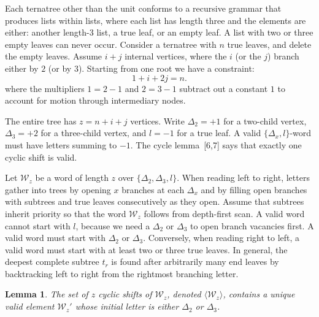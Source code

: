 \documentclass[11pt,fleqn]{article}
\theoremstyle{plain}
\newtheorem*{lemma}{Lemma}
\begin{document}
	Each ternatree other than the unit conforms to a recursive grammar that 
	produces lists within lists, where each list has length three and the 
	elements are either: another length-3 list, a true leaf, or an empty 
	leaf. A list with two or three empty leaves can never occur. 
	Consider a ternatree with $n$ true leaves, and delete the empty leaves. 
	Assume $i+j$ internal vertices, where the $i$ (or the $j$) branch 
	either by $2$ (or by $3$). Starting from one root we have a constraint: 
	\[
	1+i+2j=n.
	\]
	where the multipliers $1=2-1$ and $2=3-1$ subtract out a constant $1$ 
	to account for motion through intermediary nodes. 
	
	The entire tree has $z=n+i+j$ vertices.  Write $\Delta_2=+1$ 
	for a two-child vertex, $\Delta_3=+2$ for a three-child vertex, 
	and $l=-1$ for a true leaf. A valid $\{\Delta_x,l\}$-word must
	have letters summing to $-1$. The cycle lemma~[6,7] says that exactly one cyclic shift is valid. 
	
	Let $\mathcal{W}_z$ be a word of length $z$ over $\{\Delta_2,\Delta_3,l\}$. 
	When reading left to right, letters gather into trees by opening $x$ branches 
	at each $\Delta_x$ and by filling open branches with subtrees and true leaves 
	consecutively as they open. Assume that subtrees inherit priority so that the 
	word $\mathcal{W}_z$ follows from depth-first scan. A valid word cannot start 
	with $l$, because we need a $\Delta_2$ or $\Delta_3$ to open branch vacancies 
	first. A valid word must start with $\Delta_2$ or $\Delta_3$. Conversely, 
	when reading right to left, a valid word must start with at least two or 
	three true leaves. In general, the deepest complete subtree $t_r$ is found after 
	arbitrarily many end leaves by backtracking left to right from the rightmost 
	branching letter. 
	
	\begin{lemma}
		The set of $z$ cyclic shifts of $\mathcal{W}_z$, denoted
		$\langle \mathcal{W}_z \rangle$, contains a unique valid element
		$\mathcal{W}_z'$ whose initial letter is either $\Delta_2$ or $\Delta_3$.
	\end{lemma}
	
\end{document}
